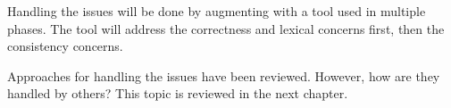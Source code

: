 Handling the {\bibtex} issues will be done by augmenting {\bibtex}
with a tool used in multiple phases.  The tool will address the
correctness and lexical concerns first, then the consistency concerns.

Approaches for handling the issues have been reviewed.  However, how
are they handled by others?  This topic is reviewed in the next
chapter.




